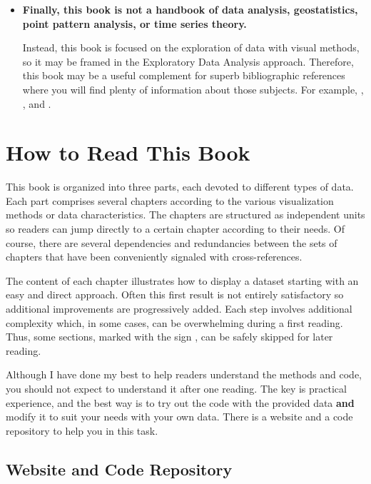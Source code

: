\begin{itemize}
\item \textbf{Finally, this book is not a handbook of data analysis,
    geostatistics, point pattern analysis, or time series theory.}

  Instead, this book is focused on the exploration of data with visual
  methods, so it may be framed in the Exploratory Data Analysis
  approach. Therefore, this book may be a useful complement for superb
  bibliographic references where you will find plenty of information
  about those subjects. For example, \cite{Chatfield2003},
  \cite{Cressie.Wikle2011}, \cite{Slocum.McMaster.ea2005} and
  \cite{Bivand.Pebesma.ea2008}.

\end{itemize}


\section{How to Read This Book}
\label{sec:how-read}

This book is organized into three parts, each devoted to different
types of data. Each part comprises several chapters according to the
various visualization methods or data characteristics. The chapters
are structured as independent units so readers can jump directly to
a certain chapter according to their needs. Of course, there are
several dependencies and redundancies between the sets of chapters
that have been conveniently signaled with cross-references.

The content of each chapter illustrates how to display a dataset
starting with an easy and direct approach. Often this first result
is not entirely satisfactory so additional improvements are
progressively added. Each step involves additional complexity
which, in some cases, can be overwhelming during a first
reading. Thus, some sections, marked with the sign \floweroneleft,
can be safely skipped for later reading.

Although I have done my best to help readers understand the methods
and code, you should not expect to understand it after one
reading. The key is practical experience, and the best way is to try
out the code with the provided data \textbf{and} modify it to suit
your needs with your own data. There is a website and a code
repository to help you in this task.

\subsection{Website and Code Repository}
\label{sec:github}

